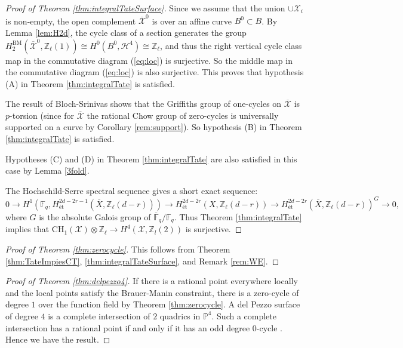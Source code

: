 \documentclass{amsart}
\theoremstyle{definition}
\theoremstyle{remark}
\newcommand{\mbb}{\mathbb}
\newcommand{\FF}{\mbb{F}}
\newcommand{\ZZ}{\mbb{Z}}
\newcommand{\PP}{\mbb{P}}
\newcommand{\mc}{\mathcal}
\newcommand{\mcX}{\mc{X}}
\newcommand{\et}{\text{\'et}}
\begin{document}
\begin{proof}[Proof of Theorem \ref{thm:integralTateSurface}]
Since we assume that the union $\cup \mcX_i$ is non-empty, the open complement $\overline{\mcX}^0$ is over an affine curve $B^0\subset B$.
By Lemma \ref{lem:H2d},
the cycle class of a section generates the group $ H_2^{\text{BM}}(\overline{\mcX}^0, \ZZ_\ell(1))\cong H^0(B^0,\mathcal{H}^4)\cong \ZZ_\ell$, and
thus the right vertical cycle class map in the commutative diagram (\ref{eq:loc}) is surjective.
So the middle map in the commutative diagram (\ref{eq:loc}) is also surjective.
This proves that hypothesis (A) in Theorem \ref{thm:integralTate} is satisfied.

The result of Bloch-Srinivas \cite[Theorem 1, (iii)]{BlochSrinivas} shows that the Griffiths group of one-cycles on $\overline{\mcX}$ is $p$-torsion (since for $\overline{\mcX}$ the rational Chow group of zero-cycles is universally supported on a curve by Corollary \ref{rem:support}). So hypothesis (B) in Theorem \ref{thm:integralTate} is satisfied.

Hypotheses (C) and (D) in Theorem \ref{thm:integralTate} are also satisfied in this case by Lemma \ref{3fold}.

The Hochschild-Serre spectral sequence gives a short exact sequence:
\[
0 \to H^1(\FF_q, H^{2d-2r-1}_\et(\overline{X}, \ZZ_\ell(d-r))) \to H^{2d-2r}_\et(X, \ZZ_\ell(d-r)) \to H^{2d-2r}_\et(\overline{X}, \ZZ_\ell(d-r))^G \to 0,
\]
where $G$ is the absolute Galois group of $\overline{\FF}_q/\FF_q$.
Thus Theorem \ref{thm:integralTate} implies that $\text{CH}_1(\mcX) \otimes \ZZ_\ell \to H^4(\mcX, \ZZ_l(2))$ is surjective.
\end{proof}

\begin{proof}[Proof of Theorem \ref{thm:zerocycle}]
This follows from Theorem \ref{thm:TateImpiesCT}, \ref{thm:integralTateSurface}, and Remark \ref{rem:WE}.
\end{proof}

\begin{proof}[Proof of Theorem \ref{thm:delpezzo4}]
If there is a rational point everywhere locally and the local points satisfy the Brauer-Manin constraint, there is a zero-cycle of degree $1$ over the function field by Theorem \ref{thm:zerocycle}.
A del Pezzo surface of degree $4$ is a complete intersection of $2$ quadrics in $\PP^4$. 
Such a complete intersection has a rational point if and only if it has an odd degree $0$-cycle \cite{Brumer_CI22}.
Hence we have the result.
\end{proof}
\end{document}
